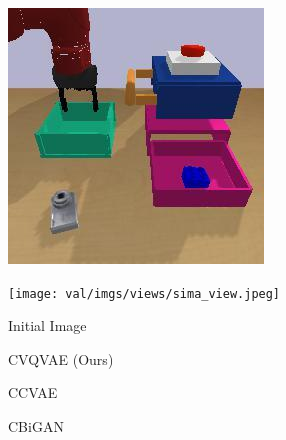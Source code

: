\begin{figure}[t]
    \begin{subfigure}[b]{0.12\textwidth}
        \center
        \includegraphics[height=0.99\textwidth]{val/imgs/views/simb_view.jpeg}
        \vspace{0.02cm}
        
        \texttt{[image: val/imgs/views/sima\_view.jpeg]}
    \end{subfigure}
    \hspace{1cm}
    \begin{subfigure}[b]{0.14\textwidth}
        \begin{flushright}
        
        Initial Image
        
        \vspace{0.35cm}
        
        CVQVAE (Ours)
        
        \vspace{0.35cm}
        
        CCVAE
        
        \vspace{0.35cm}
        
        CBiGAN
        
        \vspace{0.35cm}
        

\end{flushright}
\end{subfigure}
\end{figure}
